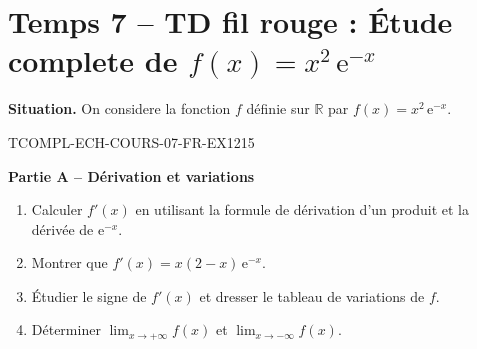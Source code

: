 

\section*{Temps 7 -- TD fil rouge : Étude complete de $f(x) = x^2\,\mathrm{e}^{-x}$}

\textbf{Situation.} On considere la fonction $f$ définie sur $\mathbb{R}$ par $f(x) = x^2\,\mathrm{e}^{-x}$.

\bigskip


\begin{exercice}{TCOMPL-ECH-COURS-07-FR-EX1}{2}{15}

\textbf{Partie A -- Dérivation et variations}

\begin{enumerate}
  \item Calculer $f'(x)$ en utilisant la formule de dérivation d'un produit et la dérivée de $\mathrm{e}^{-x}$.
  \item Montrer que $f'(x) = x(2-x)\,\mathrm{e}^{-x}$.
  \item Étudier le signe de $f'(x)$ et dresser le tableau de variations de $f$.
  \item Déterminer $\lim_{x \to +\infty} f(x)$ et $\lim_{x \to -\infty} f(x)$.
\end{enumerate}

\end{exercice}

